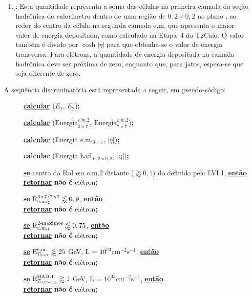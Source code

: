 \begin{enumerate}
\item \textbf{\ethad}: Esta quantidade representa a soma das células na
primeira camada da seção hadrônica do calorímetro dentro de uma região de $0,2
\times 0,2$ no plano \ep, ao redor do centro da célula na segunda camada
e.m. que apresenta o maior valor de energia depositada, como calculado na
Etapa~4 do T2Calo. O valor também é divido por $\cosh{|\eta|}$ para que
obtenha-se o valor de energia transversa. Para elétrons, a quantidade de
energia depositada na camada hadrônica deve ser próxima de zero, enquanto que,
para jatos, espera-se que seja diferente de zero.
\end{enumerate}

A seqüência discriminatória está representada a seguir, em pseudo-código:

\newcommand{\textbu}[1]{\textbf{\underline{#1}}}
\newcommand{\IF}[1]{\textbu{se} #1, \textbu{então}}
\newcommand{\RETURN}[1]{\\ \textbu{retornar} #1\textbf{;}}
\newcommand{\EVALTWO}[3]{\textbu{calcular} #1(#2, #3)\textbf{;}}
\newcommand{\lumihi}{\ensuremath{10^{33} \text{cm}^{-2}\text{s}^{-1}}}

\begin{description}
\item[] \EVALTWO{\eratio}{$E_1$}{$E_2$}
\item[] \EVALTWO{\rcore}{$\text{Energia}^{e.m.2}_{3\times7}$}{$\text{Energia}^{e.m.2}_{7\times7}$}
\item[] \EVALTWO{\etem}{Energia e.m.$_{3\times7}$}{$|\eta|$}
\item[] \EVALTWO{\ethad}{Energia had.$_{0,2\times0,2}$}{$|\eta|$}

\item[] \IF{centro da RoI em e.m.2 distante ($\gtrapprox 0,1$) do
definido pelo LVL1}
	\RETURN{\textbf{não é} elétron}

\item[] \IF{$\rcore \lessapprox 0,9$}
	\RETURN{\textbf{não é} elétron}

\item[] \IF{$\eratio \lessapprox 0,75$}
	\RETURN{\textbf{não é} elétron}

\item[] \IF{$\etem \lessapprox 25$ GeV, L = \lumihi}
	\RETURN{\textbf{não é} elétron}

\item[] \IF{$\ethad \gtrapprox 1$ GeV, L = \lumihi}
	\RETURN{\textbf{não é} elétron}

\end{description}

